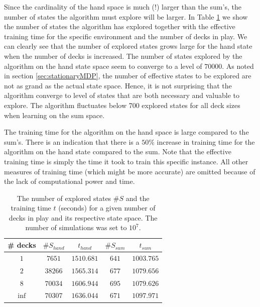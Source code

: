 Since the cardinality of the hand space is much (!) larger than the sum's, the number of states the algorithm must explore will be larger. In Table \ref{tab:state_visited} we show the number of states the algorithm has explored together with the effective training time for the specific environment and the number of decks in play. We can clearly see that the number of explored states grows large for the hand state when the number of decks is increased. The number of states explored by the algorithm on the hand state space seem to converge to a level of $70 000$. As noted in section \ref{sec:stationaryMDP}, the number of effective states to be explored are not as grand as the actual state space. Hence, it is not surprising that the algorithm converge to level of states that are both necessary and valuable to explore. The algorithm fluctuates below 700 explored states for all deck sizes when learning on the sum space.

The training time for the algorithm on the hand space is large compared to the sum's. There is an indication that there is a $50\%$ increase in training time for the algorithm on the hand state compared to the sum. Note that the effective training time is simply the time it took to train this specific instance. All other measures of training time (which might be more accurate) are omitted because of the lack of computational power and time. 
\begin{table}[h!]
\centering
 \begin{tabular}{c|cc|cc}
  \# decks & $\#S_{hand}$ & $t_{hand}$ & $\#S_{sum}$ &  $t_{sum}$  \\
  \hline 
  $1$ & $7651$ & $1510.681$ & $641$ & $1003.765$ \\
  $2$ & $38266$ & $1565.314$ & $677$ & $1079.656$ \\
  $8$ & $70034$ & $1606.944$ & $695$ & $1079.626$ \\
  $\inf$ & $70307$ & $1636.044$ & $671$ & $1097.971$ 
 \end{tabular} 
 \caption{The number of explored states $\#S$ and the training time $t$ (seconds) for a given number of decks in play and its respective state space. The number of simulations was set to $10^7$.\label{tab:state_visited}}
\end{table}

